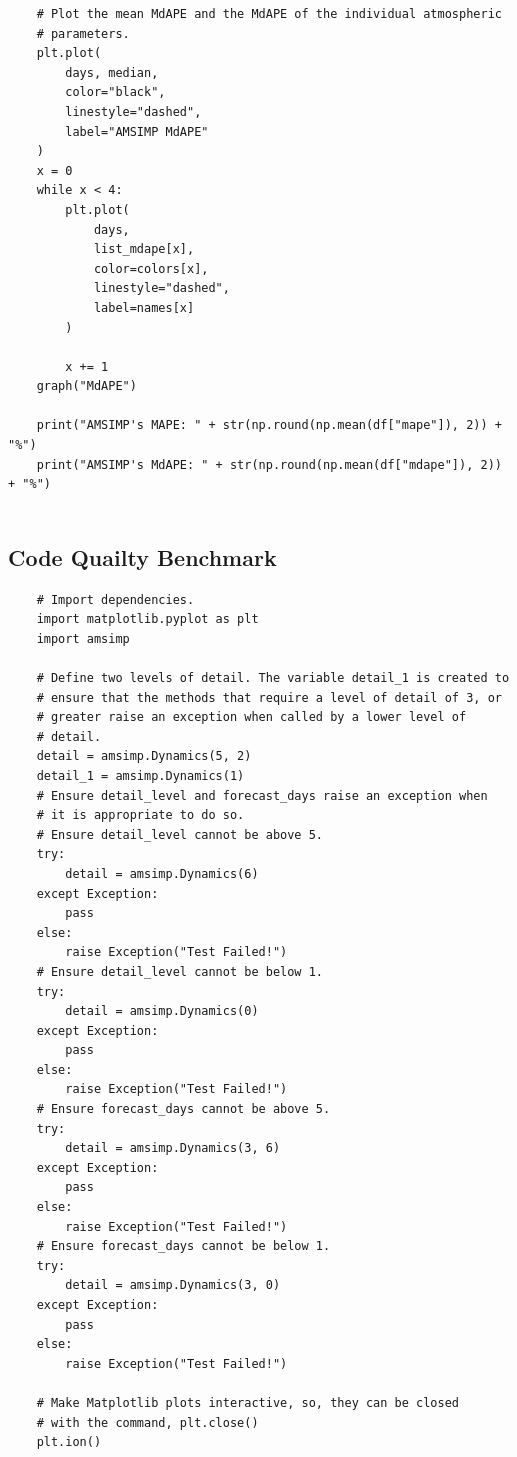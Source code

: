 \begin{appendices}
\begin{verbatim}
    # Plot the mean MdAPE and the MdAPE of the individual atmospheric
    # parameters.
    plt.plot(
        days, median, 
        color="black", 
        linestyle="dashed", 
        label="AMSIMP MdAPE"
    )
    x = 0
    while x < 4:
        plt.plot(
            days, 
            list_mdape[x], 
            color=colors[x], 
            linestyle="dashed", 
            label=names[x]
        )
    
        x += 1
    graph("MdAPE")
    
    print("AMSIMP's MAPE: " + str(np.round(np.mean(df["mape"]), 2)) + "%")
    print("AMSIMP's MdAPE: " + str(np.round(np.mean(df["mdape"]), 2)) + "%")
    
    \end{verbatim}
    
    \subsection{Code Quailty Benchmark}
    \begin{verbatim}
    # Import dependencies.
    import matplotlib.pyplot as plt
    import amsimp
    
    # Define two levels of detail. The variable detail_1 is created to
    # ensure that the methods that require a level of detail of 3, or
    # greater raise an exception when called by a lower level of
    # detail.
    detail = amsimp.Dynamics(5, 2)
    detail_1 = amsimp.Dynamics(1)
    # Ensure detail_level and forecast_days raise an exception when
    # it is appropriate to do so.
    # Ensure detail_level cannot be above 5.
    try:
        detail = amsimp.Dynamics(6)
    except Exception:
        pass
    else:
        raise Exception("Test Failed!")
    # Ensure detail_level cannot be below 1.
    try:
        detail = amsimp.Dynamics(0)
    except Exception:
        pass
    else:
        raise Exception("Test Failed!")
    # Ensure forecast_days cannot be above 5.
    try:
        detail = amsimp.Dynamics(3, 6)
    except Exception:
        pass
    else:
        raise Exception("Test Failed!")
    # Ensure forecast_days cannot be below 1.
    try:
        detail = amsimp.Dynamics(3, 0)
    except Exception:
        pass
    else:
        raise Exception("Test Failed!")
    
    # Make Matplotlib plots interactive, so, they can be closed
    # with the command, plt.close()
    plt.ion()
    

\end{verbatim}
\end{appendices}
